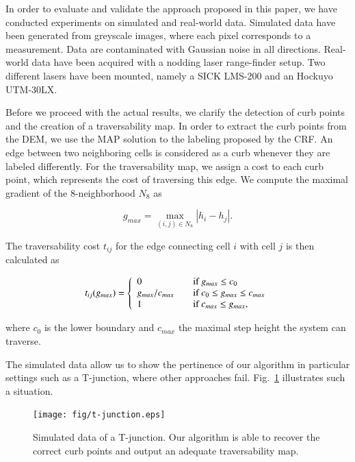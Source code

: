 In order to evaluate and validate the approach proposed in this paper, we have
conducted experiments on simulated and real-world data. Simulated data have been
generated from greyscale images, where each pixel corresponds to a measurement.
Data are contaminated with Gaussian noise in all directions. Real-world data
have been acquired with a nodding laser range-finder setup. Two different lasers
have been mounted, namely a SICK LMS-200 and an Hockuyo UTM-30LX.

Before we proceed with the actual results, we clarify the detection of curb
points and the creation of a traversability map. In order to extract the curb
points from the DEM, we use the MAP solution to the labeling proposed by the
CRF. An edge between two neighboring cells is considered as a curb whenever they
are labeled differently. For the traversability map, we assign a cost to each
curb point, which represents the cost of traversing this edge. We compute the
maximal gradient of the 8-neighborhood $N_8$ as

\begin{equation}
\label{8-neighborhood}
g_{max}=\max_{(i,j)\in N_8}|h_i-h_j|.
\end{equation}

The traversability cost $t_{ij}$ for the edge connecting cell $i$ with cell $j$
is then calculated as

\begin{eqnarray}
\label{eqn:traversability}
t_{ij}(g_{max})=
\left\{
\begin{array}{l l}
0 & \quad \text{if $g_{max}\le c_0$}\\
g_{max}/c_{max} & \quad \text{if $c_0\le g_{max}\le c_{max}$}\\
1 & \quad \text{if $c_{max}\le g_{max}$},
\end{array} \right.
\end{eqnarray}

where $c_0$ is the lower boundary and $c_{max}$ the maximal step height the
system can traverse.

The simulated data allow us to show the pertinence of our algorithm in
particular settings such as a T-junction, where other approaches fail.
Fig.~\ref{fig:t-junction} illustrates such a situation.

\begin{figure}[t]
\centering
\texttt{[image: fig/t-junction.eps]}
\caption{Simulated data of a T-junction. Our algorithm is able to recover the
correct curb points and output an adequate traversability map.}
\label{fig:t-junction}
\end{figure}

